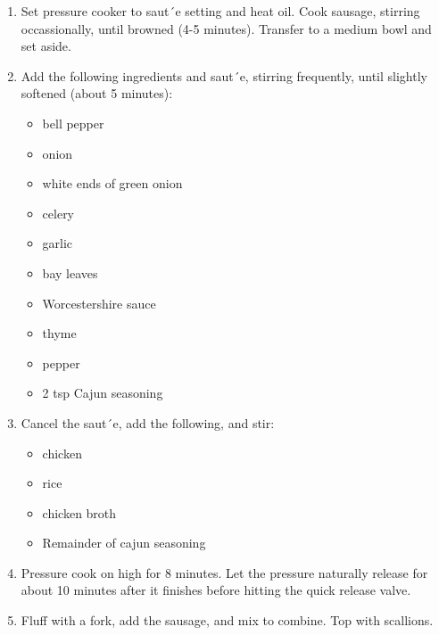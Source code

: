 \begin{enumerate}
\item Set pressure cooker to saut´e setting and heat oil. Cook sausage, stirring occassionally, until browned (4-5
    minutes). Transfer to a medium bowl and set aside.
\item Add the following ingredients and saut´e, stirring frequently, until slightly softened (about 5 minutes):
\begin{itemize}
    \item bell pepper
    \item onion
    \item white ends of green onion
    \item celery
    \item garlic
    \item bay leaves
    \item Worcestershire sauce
    \item thyme
    \item pepper
    \item 2 tsp Cajun seasoning
\end{itemize}
\item Cancel the saut´e, add the following, and stir:
\begin{itemize}
    \item chicken
    \item rice
    \item chicken broth
    \item Remainder of cajun seasoning
\end{itemize}
\item Pressure cook on high for 8 minutes. Let the pressure naturally release for about 10 minutes after it finishes
    before hitting the quick release valve.
\item Fluff with a fork, add the sausage, and mix to combine. Top with scallions.
\end{enumerate}
